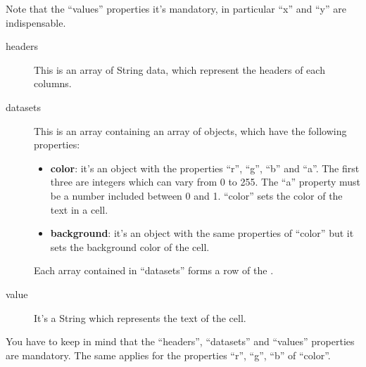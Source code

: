 		Note that the “values” properties it's mandatory, in particular “x” and “y” are indispensable.
		\begin{description}
			\item[headers] This is an array of String data, which represent the headers of each columns.
			\item[datasets] This is an array containing an array of objects, which have the following properties:
			\begin{itemize}
				\item \textbf{color}: it's an object with the properties “r”, “g”, “b” and “a”. The first three are integers which can vary from 0 to 255. The “a” property must be a number included between 0 and 1.
				“color” sets the color of the text in a cell.
				\item \textbf{background}: it's an object with the same properties of “color” but it sets the background color of the cell.
			\end{itemize}
			Each array contained in “datasets” forms a row of the .
			\item[value] It's a String which represents the text of the cell.
		\end{description}
		You have to keep in mind that the “headers”, “datasets” and “values” properties are mandatory. The same applies for the properties “r”, “g”, “b” of “color”.

